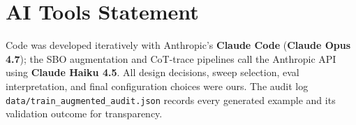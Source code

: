 \documentclass[10pt]{article}
\begin{document}
\section{AI Tools Statement}

Code was developed iteratively with Anthropic's \textbf{Claude Code}
(\textbf{Claude Opus 4.7}); the SBO augmentation and CoT-trace pipelines
call the Anthropic API using \textbf{Claude Haiku 4.5}. All design
decisions, sweep selection, eval interpretation, and final configuration
choices were ours. The audit log
\texttt{data/train\_augmented\_audit.json} records every generated
example and its validation outcome for transparency.
\end{document}
